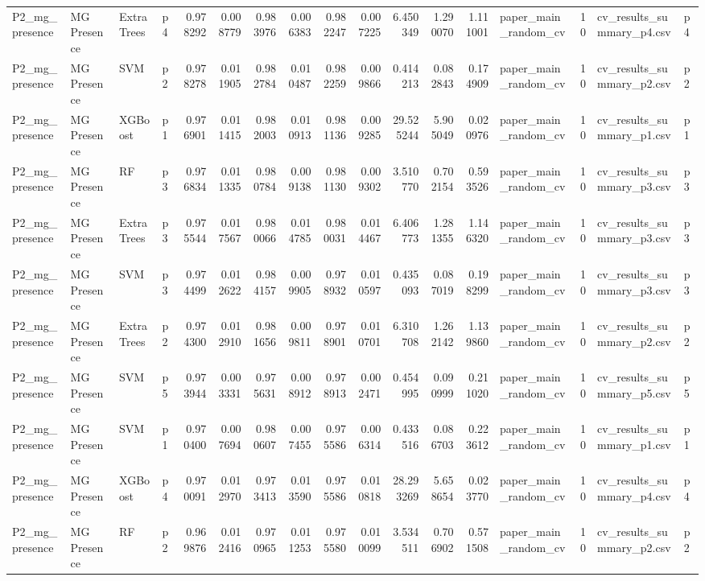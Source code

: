 \begin{tabular}{llllrrrrrrrrrlrll}
P2_mg_presence & MG Presence & ExtraTrees & p4 & 0.978292 & 0.008779 & 0.983976 & 0.006383 & 0.982247 & 0.007225 & 6.450349 & 1.290070 & 1.111001 & paper_main_random_cv & 10 & cv_results_summary_p4.csv & p4 \\
P2_mg_presence & MG Presence & SVM & p2 & 0.978278 & 0.011905 & 0.982784 & 0.010487 & 0.982259 & 0.009866 & 0.414213 & 0.082843 & 0.174909 & paper_main_random_cv & 10 & cv_results_summary_p2.csv & p2 \\
P2_mg_presence & MG Presence & XGBoost & p1 & 0.976901 & 0.011415 & 0.982003 & 0.010913 & 0.981136 & 0.009285 & 29.525244 & 5.905049 & 0.020976 & paper_main_random_cv & 10 & cv_results_summary_p1.csv & p1 \\
P2_mg_presence & MG Presence & RF & p3 & 0.976834 & 0.011335 & 0.980784 & 0.009138 & 0.981130 & 0.009302 & 3.510770 & 0.702154 & 0.593526 & paper_main_random_cv & 10 & cv_results_summary_p3.csv & p3 \\
P2_mg_presence & MG Presence & ExtraTrees & p3 & 0.975544 & 0.017567 & 0.980066 & 0.014785 & 0.980031 & 0.014467 & 6.406773 & 1.281355 & 1.146320 & paper_main_random_cv & 10 & cv_results_summary_p3.csv & p3 \\
P2_mg_presence & MG Presence & SVM & p3 & 0.974499 & 0.012622 & 0.984157 & 0.009905 & 0.978932 & 0.010597 & 0.435093 & 0.087019 & 0.198299 & paper_main_random_cv & 10 & cv_results_summary_p3.csv & p3 \\
P2_mg_presence & MG Presence & ExtraTrees & p2 & 0.974300 & 0.012910 & 0.981656 & 0.009811 & 0.978901 & 0.010701 & 6.310708 & 1.262142 & 1.139860 & paper_main_random_cv & 10 & cv_results_summary_p2.csv & p2 \\
P2_mg_presence & MG Presence & SVM & p5 & 0.973944 & 0.003331 & 0.975631 & 0.008912 & 0.978913 & 0.002471 & 0.454995 & 0.090999 & 0.211020 & paper_main_random_cv & 10 & cv_results_summary_p5.csv & p5 \\
P2_mg_presence & MG Presence & SVM & p1 & 0.970400 & 0.007694 & 0.980607 & 0.007455 & 0.975586 & 0.006314 & 0.433516 & 0.086703 & 0.223612 & paper_main_random_cv & 10 & cv_results_summary_p1.csv & p1 \\
P2_mg_presence & MG Presence & XGBoost & p4 & 0.970091 & 0.012970 & 0.973413 & 0.013590 & 0.975586 & 0.010818 & 28.293269 & 5.658654 & 0.023770 & paper_main_random_cv & 10 & cv_results_summary_p4.csv & p4 \\
P2_mg_presence & MG Presence & RF & p2 & 0.969876 & 0.012416 & 0.970965 & 0.011253 & 0.975580 & 0.010099 & 3.534511 & 0.706902 & 0.571508 & paper_main_random_cv & 10 & cv_results_summary_p2.csv & p2 \\

\end{tabular}
